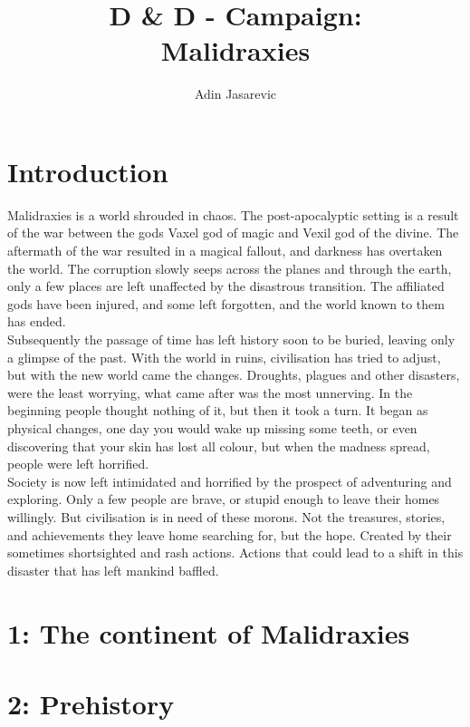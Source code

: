 \documentclass[a4paper]{book}
\title{D \& D - Campaign: \\ Malidraxies}
\author{Adin Jasarevic}
\begin{document}
\begin{titlepage}
\maketitle
\end{titlepage}
\makeatletter
\renewcommand\thesection{}
\renewcommand\thesubsection{\@arabic\c@section.\@arabic\c@subsection}
\makeatother
\section{Introduction}
Malidraxies is a world shrouded in chaos. The post-apocalyptic setting is a result of the war between the gods Vaxel god of magic and Vexil god of the divine. The aftermath of the war resulted in a magical fallout, and darkness has overtaken the world. The corruption slowly seeps across the planes and through the earth, only a few places are left unaffected by the disastrous transition. The affiliated gods have been injured, and some left forgotten, and the world known to them has ended.\\ Subsequently the passage of time has left history soon to be buried, leaving only a glimpse of the past. With the world in ruins, civilisation has tried to adjust, but with the new world came the changes. Droughts, plagues and other disasters, were the least worrying, what came after was the most unnerving. In the beginning people thought nothing of it, but then it took a turn. It began as physical changes, one day you would wake up missing some teeth, or even discovering that your skin has lost all colour, but when the madness spread, people were left horrified.\\
Society is now left intimidated and horrified by the prospect of adventuring and exploring. Only a few people are brave, or stupid enough to leave their homes willingly. But civilisation is in need of these morons. Not the treasures, stories, and achievements they leave home searching for, but the hope. Created by their sometimes shortsighted and rash actions. Actions that could lead to a shift in this disaster that has left mankind baffled.
\tableofcontents
\newpage

\section{1: The continent of Malidraxies}

\section{2: Prehistory}
\end{document}
